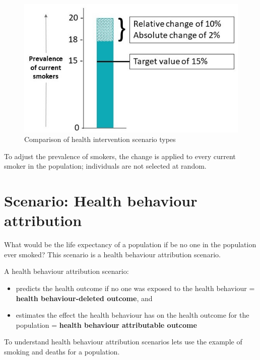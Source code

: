 \documentclass[]{book}
\begin{document}
\begin{figure}

{\centering \includegraphics{Images/Scenario-Abs, Rel, Target cropped} 

}

\caption{Comparison of health intervention scenario types}\label{fig:unnamed-chunk-12}
\end{figure}

To adjust the prevalence of smokers, the change is applied to every current smoker in the population; individuals are not selected at random.

\hypertarget{scenario-health-behaviour-attribution}{%
\section{Scenario: Health behaviour attribution}\label{scenario-health-behaviour-attribution}}

What would be the life expectancy of a population if be no one in the population ever smoked? This scenario is a health behaviour attribution scenario.

A health behaviour attribution scenario:

\begin{itemize}
\item
  predicts the health outcome if no one was exposed to the health behaviour = \textbf{health behaviour-deleted outcome}, and
\item
  estimates the effect the health behaviour has on the health outcome for the population = \textbf{health behaviour attributable outcome}
\end{itemize}

To understand health behaviour attribution scenarios lets use the example of smoking and deaths for a population.
\end{document}
